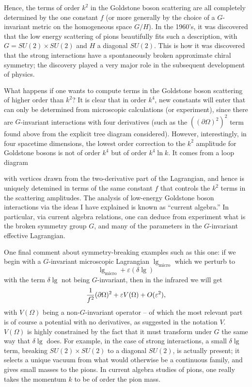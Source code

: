 Hence, the terms of order $k^2$ in the Goldstone boson scattering
are all completely determined by the one constant $f$ (or more generally
by the choice of a $G$-invariant metric on the homogeneous space $G/H$).
In the 1960's, it was discovered that the low energy scattering of pions
beautifully fits such a description, with $G=SU(2)\times SU(2)$ and
$H$ a diagonal $SU(2)$.  This is how it was discovered that the strong
interactions have a spontaneously broken approximate chiral symmetry;
the discovery played a very major role in the subsequent development of
physics.

What happens if one wants to compute terms in the Goldstone boson
scattering of higher order than $k^2$?  It is clear that in order $k^4$,
new constants will enter that can only be determined from microscopic
calculations (or experiment), since there are $G$-invariant interactions
with four derivatives (such as the $((\partial\Omega)^2)^2$ term found
above from the explicit tree diagram considered).  However, interestingly,
in four spacetime dimensions, the lowest order correction to the $k^2$
amplitude for Goldstone bosons is not of order $k^4$ but of order
$k^4\ln k$.
It comes from a loop diagram 

\centerline{\epsfxsize=2in}
\centerline{\quad}

\noindent
with vertices drawn from the two-derivative part of the Lagrangian,
and hence is uniquely detemined in terms of the same constant $f$ that
controls the $k^2$ terms in the scattering amplitudes.  The analysis
of low-energy Goldstone boson interactions via the ideas I have explained
is known as ``current algebra.''  In particular, via current algebra
relations, one can deduce from experiment what is the broken symmetry
group $G$, and many of the parameters in the $G$-invariant effective 
Lagrangian.

One final comment about symmetry-breaking examples such as this one: 
if we begin with a $G$-invariant microscopic Lagrangian
$\lg_{\text{micro}}$ which we perturb to
$$\lg_{\text{micro}}+\varepsilon(\delta\lg)$$
with the term $\delta\lg$ not being $G$-invariant, then  in the infrared we
will get
$${1\over f^2}(\partial\Omega)^2+\varepsilon V(\Omega)+O(\varepsilon^2),$$
with $V(\Omega)$ being a non-$G$-invariant operator -- of which the most
relevant part is of course a potential with no derivatives, as suggested
in the notation $V$.
$V(\Omega)$ is highly constrained by the fact that it must transform
under $G$ the same way that $\delta\lg$ does.  For example, in the case
of strong interactions, a small $\delta\lg$ term, breaking $SU(2)\times SU(2)$
to a diagonal $SU(2)$, is actually present; it selects a unique vacuum
from what would otherwise be a continuous family, and gives small masses
to the pions.  In current algebra studies of pions, one really takes the
momentum $k$ to be of order the pion mass.


